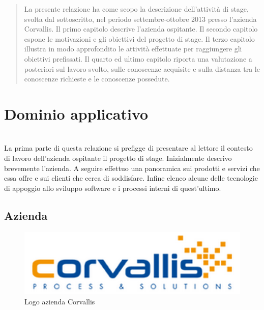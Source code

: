 \newcommand{\Versione}{1.0}%
\newcommand{\Data}{2013-01-21}%




\null\vspace{2.0in}
\begin{abstract}
La presente relazione ha come scopo la descrizione dell'attività di stage, svolta dal sottoscritto, nel periodo settembre-ottobre 2013 presso l'azienda Corvallis. Il primo capitolo descrive l'azienda ospitante. Il secondo capitolo espone le motivazioni e gli obiettivi del progetto di stage. Il terzo capitolo illustra in modo approfondito le attività effettuate per raggiungere gli obiettivi prefissati. Il quarto ed ultimo capitolo riporta una valutazione a posteriori sul lavoro svolto, sulle conoscenze acquisite e sulla distanza tra le conoscenze richieste e le conoscenze possedute.
\end{abstract}
\vspace{\fill}
%
\newpage



\newpage
\tableofcontents

\newpage

\listoftables
\listoffigures

\newpage

\section{Dominio applicativo}\\
\label{1.0}
La prima parte di questa relazione si prefigge di presentare al lettore il contesto di lavoro dell'azienda ospitante il progetto di stage. Inizialmente descrivo brevemente l'azienda. A seguire effettuo una panoramica sui prodotti e servizi che essa offre e sui clienti che cerca di soddisfare. Infine elenco alcune delle tecnologie di appoggio allo sviluppo software e i processi interni di quest'ultimo.

\subsection{Azienda}
\label{1.1}

\begin{figure}[h!]
\centering
\includegraphics[scale=0.75]{../Logo&Header/logoCorvallis.png}
\caption{ Logo azienda Corvallis}
\end{figure}

